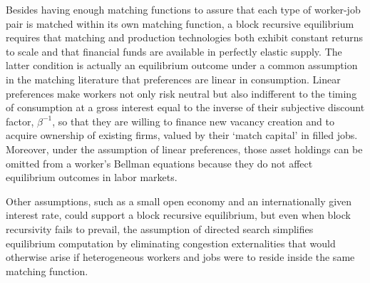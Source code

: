 Besides having enough matching functions to assure that each type of
worker-job pair is matched within its
own matching function, a block recursive equilibrium requires
that matching and production technologies both exhibit constant returns to scale and that financial funds
are available in perfectly elastic supply. The latter condition is actually
an equilibrium outcome under a common assumption in the
matching literature that preferences are linear in consumption.
Linear preferences make workers not only risk neutral but
also indifferent to the timing of consumption at a gross
interest equal to the inverse of their subjective discount
factor, $\beta^{-1}$, so that they are  willing to finance
new vacancy creation and to acquire ownership of existing
firms, valued by their `match capital' in filled jobs.
Moreover, under the assumption of linear preferences, those
asset holdings can be omitted from a worker's Bellman
equations because they do not affect equilibrium outcomes
in labor markets.

Other assumptions, such as a small
open economy and an internationally given interest rate,
could support a block recursive equilibrium,
but even when block recursivity fails to prevail,
the assumption of directed search simplifies equilibrium computation by eliminating congestion
externalities that would otherwise arise if heterogeneous
workers and jobs were to reside inside the same matching function.





